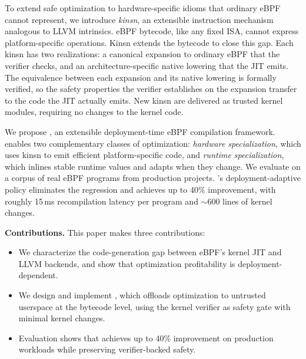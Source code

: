 To extend safe optimization to hardware-specific idioms that ordinary eBPF cannot represent, we introduce \emph{kinsn}, an extensible instruction mechanism analogous to LLVM intrinsics. eBPF bytecode, like any fixed ISA, cannot express platform-specific operations. Kinsn extends the bytecode to close this gap. Each kinsn has two realizations: a canonical expansion to ordinary eBPF that the verifier checks, and an architecture-specific native lowering that the JIT emits. The equivalence between each expansion and its native lowering is formally verified, so the safety properties the verifier establishes on the expansion transfer to the code the JIT actually emits. New kinsn are delivered as trusted kernel modules, requiring no changes to the kernel code.

We propose \tool, an extensible deployment-time eBPF compilation framework. \tool enables two complementary classes of optimization: \emph{hardware specialization}, which uses kinsn to emit efficient platform-specific code, and \emph{runtime specialization}, which inlines stable runtime values and adapts when they change. We evaluate \tool on a corpus of real eBPF programs from production projects. \tool's deployment-adaptive policy eliminates the regression and achieves up to 40\% improvement, with roughly 15\,ms recompilation latency per program and ${\sim}600$ lines of kernel changes.

\noindent\textbf{Contributions.}
This paper makes three contributions:
\begin{itemize}
    \item We characterize the code-generation gap between eBPF's kernel JIT and LLVM backends, and show that optimization profitability is deployment-dependent.
    \item We design and implement \tool, which offloads optimization to untrusted userspace at the bytecode level, using the kernel verifier as safety gate with minimal kernel changes.
    \item Evaluation shows that \tool achieves up to 40\% improvement on production workloads while preserving verifier-backed safety.
\end{itemize}

